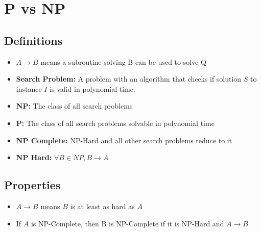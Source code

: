 \documentclass{article}
\begin{document}
\section*{P vs NP}
\subsection*{Definitions}
\begin{itemize}
    \item $A \rightarrow B$ means a subroutine solving B can be used to solve Q
    \item \textbf{Search Problem: } A problem with an algorithm that checks if solution $S$ to instance $I$ is valid in polynomial time.
    \item \textbf{NP: } The class of all search problems
    \item \textbf{P: } The class of all search problems solvable in polynomial time
    \item \textbf{NP Complete: } NP-Hard and all other search problems reduce to it
    \item \textbf{NP Hard: } $\forall B \in NP, B\rightarrow A$
\end{itemize}
\subsection*{Properties}
\begin{itemize}
    \item $A \rightarrow B$ means $B$ is at least as hard as $A$
    \item If $A$ is NP-Complete, then B is NP-Complete if it is NP-Hard and $A \rightarrow B$
\end{itemize}
\end{document}
